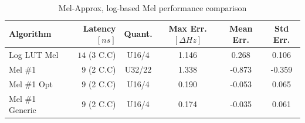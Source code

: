 \begin{table}[H]
    \hspace*{-1.8cm}
\begin{tabular}{ !{\color{mtblborder}\vrule}l!{\color{mtblborder}\vrule}rcccc| } 
    \hline

    \hline
     \color{white}\bf{Algorithm} 
    & \color{white}\bf{Latency \([ns]\)}  
    & \color{white}\bf{Quant.} 
    & \color{white}\bf{Max Err. \([\Delta Hz]\)}
    & \color{white}\bf{Mean Err.}
    & \color{white}\bf{Std Err.} \\
    \hline

    \hline
     Log LUT Mel   & \(14\) (3 C.C) & U16/4 & 1.146 & 0.268 & 0.106 \\
    \hline
    
    \hline
     Mel \#1   & \(9\) (2 C.C) &  U32/22  & 1.338 & -0.873 & -0.359 \\
    \hline
    
    \hline
     Mel \#1 Opt      & \(9\) (2 C.C) &  U16/4  & 0.190 & -0.053 & 0.065 \\
    \hline

    \hline
     Mel \#1 Generic     & \(9\) (2 C.C) &  U16/4  & \color{gtblcaption}0.174 & \color{gtblcaption}-0.035 & \color{gtblcaption}0.061 \\
    \hline

    \hline
\end{tabular}
\caption{Mel-Approx, log-based Mel performance comparison}
\label{tbl:mel_scale_performance}
\end{table}



